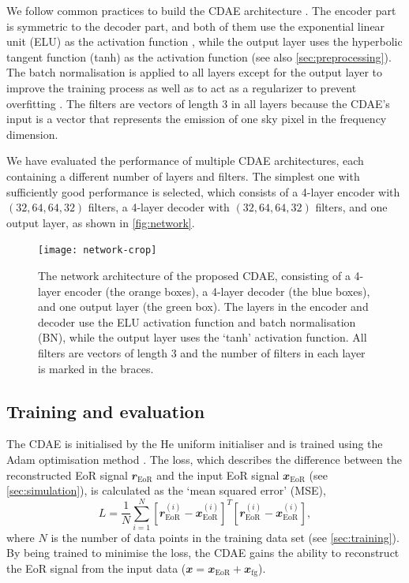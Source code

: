 \documentclass[letters,fleqn,usenatbib,onecolumn]{mnras}
\newcommand{\R}[1]{\mathrm{#1}}
\newcommand{\B}[1]{\mathbfit{#1}}
\begin{document}
We follow common practices to build the CDAE architecture
\citep[e.g.,][]{suganuma2018,geron2017}.
The encoder part is symmetric to the decoder part, and both of them
use the exponential linear unit (ELU) as the activation function
\citep{clevert2016},
while the output layer uses the hyperbolic tangent function (tanh)
as the activation function (see also \autoref{sec:preprocessing}).
The batch normalisation is applied to all layers except for the output
layer to improve the training process as well as to act as a regularizer
to prevent overfitting \citep{ioffe2015}.
{\color{cyan}%
The filters are vectors of length 3 in all layers because the CDAE's
input is a vector that represents the emission of one sky pixel in the
frequency dimension.}

We have evaluated the performance of multiple CDAE architectures, each
containing a different number of layers and filters.
The simplest one with sufficiently good performance is selected,
which consists of a 4-layer encoder with $(32,64,64,32)$ filters,
a 4-layer decoder with $(32,64,64,32)$ filters, and one output layer,
as shown in \autoref{fig:network}.

\begin{figure}
  \centering
  \texttt{[image: network-crop]}
  \caption{\label{fig:network}%
    The network architecture of the proposed CDAE, consisting of a
    4-layer encoder (the orange boxes), a 4-layer decoder (the blue
    boxes), and one output layer (the green box).
    The layers in the encoder and decoder use the ELU activation
    function and batch normalisation (BN), while the output layer uses
    the `tanh' activation function.
    All filters are vectors of length 3 and the number of filters in
    each layer is marked in the braces.
  }
\end{figure}


\subsection{Training and evaluation}
\label{sec:train-eval}

The CDAE is initialised by the He uniform initialiser \citep{he2015}
and is trained using the Adam optimisation method \citep{kingma2015}.
{\color{cyan}%
The loss, which describes the difference between the reconstructed EoR
signal $\B{r}_{\R{EoR}}$ and the input EoR signal $\B{x}_{\R{EoR}}$
(see \autoref{sec:simulation}),
is calculated as the `mean squared error' (MSE),
\begin{equation}
  \label{eq:loss}
  L = \frac{1}{N} \sum_{i=1}^{N}
    \left[ \B{r}_{\R{EoR}}^{(i)} - \B{x}_{\R{EoR}}^{(i)} \right]^T
    \left[ \B{r}_{\R{EoR}}^{(i)} - \B{x}_{\R{EoR}}^{(i)} \right],
\end{equation}
where $N$ is the number of data points in the training data set
(see \autoref{sec:training}).} %
By being trained to minimise the loss, the CDAE gains the ability to
reconstruct the EoR signal from the input data
($\B{x} = \B{x}_{\R{EoR}} + \B{x}_{\R{fg}}$).
\end{document}
